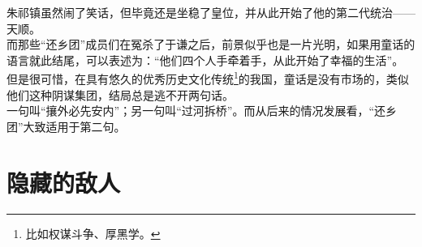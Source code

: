 \begin{multicols}{\theparacolNo}
朱祁镇虽然闹了笑话，但毕竟还是坐稳了皇位，并从此开始了他的第二代统治——天顺。\\

而那些“还乡团”成员们在冤杀了于谦之后，前景似乎也是一片光明，如果用童话的语言就此结尾，可以表述为：“他们四个人手牵着手，从此开始了幸福的生活”。\\

但是很可惜，在具有悠久的优秀历史文化传统\footnote{比如权谋斗争、厚黑学。}的我国，童话是没有市场的，类似他们这种阴谋集团，结局总是逃不开两句话。\\

一句叫“攘外必先安内”；另一句叫“过河拆桥”。而从后来的情况发展看，“还乡团”大致适用于第二句。\\
\ifnum{}
	\end{multicols}
\fi
\newpage
\section{隐藏的敌人}
\ifnum{}
